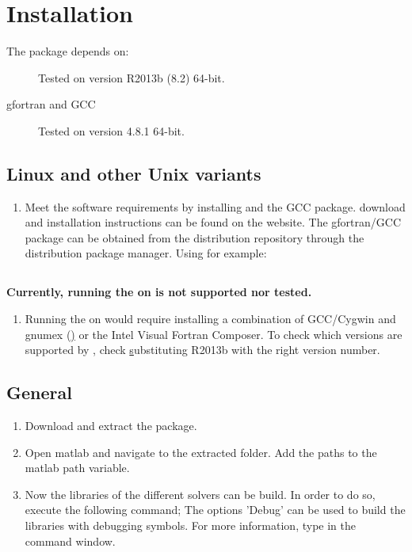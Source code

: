 \chapter[Installation]{Installation}
The \PPODESUITE package depends on:
\begin{description}
  \item[\MATLAB] Tested on \MATLAB version R2013b (8.2) 64-bit.
  \item[gfortran and GCC] Tested on version 4.8.1 64-bit.
\end{description}

\section[\nix]{Linux and other Unix variants}
\begin{enumerate}
 \item Meet the software requirements by installing \MATLAB and the GCC package. \MATLAB download and installation instructions can be found on the \MATHWORKS website. The gfortran/GCC package can be obtained from the \nix distribution repository through the distribution package manager. Using \UBUNTU for example:
\end{enumerate}

\section[Windows]{\MSDOS}
\textbf{Currently, running the \PPODESUITE on \MSDOS is not supported nor tested.}
\begin{enumerate}
 \item Running the \PPODESUITE on \MSDOS would require installing a combination of GCC/Cygwin and gnumex (\hyperlink{http://gnumex.sourceforge.net/}) or the Intel Visual Fortran Composer. To check which versions are supported by \MATLAB, check \hyperlink{http://www.mathworks.nl/support/compilers/R2013b/} substituting R2013b with the right version number.
\end{enumerate}

\section{General}
\begin{enumerate}[resume]
 \item Download and extract the \PPODESUITE package.
 \item Open matlab and navigate to the extracted \PPODESUITE folder. Add the \PPODE paths to the matlab path variable.
 \item Now the libraries of the different solvers can be build. In order to do so, execute the following command;
 The options 'Debug' can be used to build the libraries with debugging symbols.
 For more information, type  in the \MATLAB command window.
\end{enumerate}
